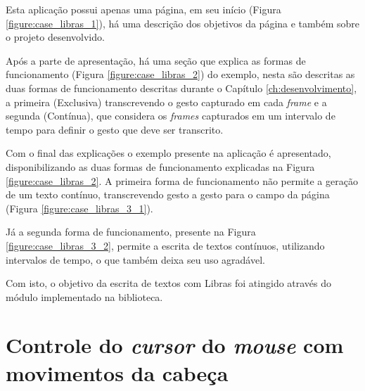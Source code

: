 \par Esta aplicação possui apenas uma página, em seu início (Figura \ref{figure:case_libras_1}), há uma descrição dos objetivos da página e também sobre o projeto desenvolvido.


\par Após a parte de apresentação, há uma seção que explica as formas de funcionamento (Figura \ref{figure:case_libras_2}) do exemplo, nesta são descritas as duas formas de funcionamento descritas durante o Capítulo \ref{ch:desenvolvimento}, a primeira (Exclusiva) transcrevendo o gesto capturado em cada \textit{frame} e a segunda (Contínua), que considera os \textit{frames} capturados em um intervalo de tempo para definir o gesto que deve ser transcrito.


\par Com o final das explicações o exemplo presente na aplicação é apresentado, disponibilizando as duas formas de funcionamento explicadas na Figura \ref{figure:case_libras_2}. A primeira forma de funcionamento não permite a geração de um texto contínuo, transcrevendo gesto a gesto para o campo da página (Figura \ref{figure:case_libras_3_1}). 


\par Já a segunda forma de funcionamento, presente na Figura \ref{figure:case_libras_3_2}, permite a escrita de textos contínuos, utilizando intervalos de tempo, o que também deixa seu uso agradável.


\par Com isto, o objetivo da escrita de textos com Libras foi atingido através do módulo implementado na biblioteca.

\section{Controle do \textit{cursor} do \textit{mouse} com movimentos da cabeça}

